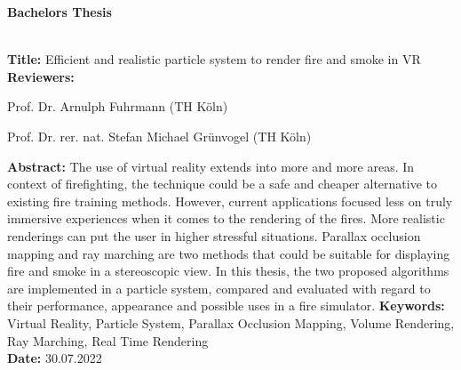 \begin{flushleft}
	\begin{huge}
		\textbf{Bachelors Thesis}
	\end{huge}
	~\\
	\textbf{Title:} Efficient and realistic particle system to render fire and smoke in VR
	~\\
	\doublespacing
	\textbf{Reviewers:}
	\begin{description}
		\vspace{-0.2cm}
		\itemsep-8pt
		\item[–]
			Prof. Dr. Arnulph Fuhrmann (TH Köln)
		\item[–]
			Prof. Dr. rer. nat. Stefan Michael Grünvogel (TH Köln)
	\end{description}
	\vspace{-0.4cm}
	\singlespacing
	\textbf{Abstract:}
	The use of virtual reality extends into more and more areas.
	In context of firefighting, the technique could be a safe and cheaper
	alternative to existing fire training methods.
	However, current applications focused less on truly immersive experiences when it
	comes to the rendering of the fires. More realistic renderings can put the user in higher
	stressful situations.
	Parallax occlusion mapping and ray marching are two methods that could be suitable
	for displaying fire and smoke in a stereoscopic view.
	In this thesis, the two proposed algorithms are implemented in a particle system, compared and
	evaluated with regard to their performance, appearance and possible uses in a fire simulator.
	\singlespacing
	\textbf{Keywords:} Virtual Reality, Particle System, Parallax Occlusion Mapping, Volume Rendering, Ray Marching, Real Time Rendering\\
	\doublespacing
	\textbf{Date:} 30.07.2022
\end{flushleft}
